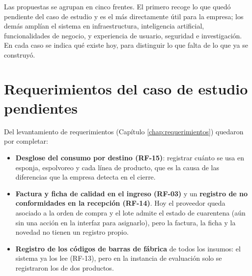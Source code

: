 

Las propuestas se agrupan en cinco frentes. El primero recoge lo que quedó pendiente del caso de estudio y es el más directamente útil para la empresa; los demás amplían el sistema en infraestructura, inteligencia artificial, funcionalidades de negocio, y experiencia de usuario, seguridad e investigación. En cada caso se indica qué existe hoy, para distinguir lo que falta de lo que ya se construyó.

\section{Requerimientos del caso de estudio pendientes}
Del levantamiento de requerimientos (Capítulo \ref{chap:requerimientos}) quedaron por completar:
\begin{itemize}
    \item \textbf{Desglose del consumo por destino (RF-15)}: registrar cuánto se usa en esponja, espolvoreo y cada línea de producto, que es la causa de las diferencias que la empresa detecta en el cierre.
    \item \textbf{Factura y ficha de calidad en el ingreso (RF-03)} y un \textbf{registro de no conformidades en la recepción (RF-14)}. Hoy el proveedor queda asociado a la orden de compra y el lote admite el estado de cuarentena (aún sin una acción en la interfaz para asignarlo), pero la factura, la ficha y la novedad no tienen un registro propio.
    \item \textbf{Registro de los códigos de barras de fábrica} de todos los insumos: el sistema ya los lee (RF-13), pero en la instancia de evaluación solo se registraron los de dos productos.
\end{itemize}


